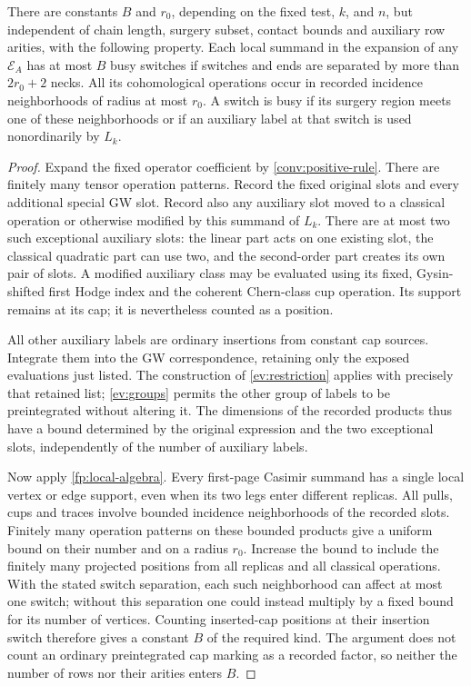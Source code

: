 \begin{lemma}\label{sew:busy-bound}
There are constants $B$ and $r_0$, depending on the fixed test, $k$,
and $n$, but independent of chain length, surgery subset, contact
bounds and auxiliary row arities, with the following property.
Each local summand in the expansion of any $\mathcal E_A$ has at most
$B$ busy switches if switches and ends are separated by more than
$2r_0+2$ necks.  All its cohomological operations occur in recorded
incidence neighborhoods of radius at most $r_0$.  A switch is busy if
its surgery region meets one of these neighborhoods or if an
auxiliary label at that switch is used nonordinarily by $L_k$.
\end{lemma}

\begin{proof}
Expand the fixed operator coefficient by \cref{conv:positive-rule}.
There are finitely many tensor operation patterns.  Record the fixed
original slots and every additional special GW slot.  Record also
any auxiliary slot moved to a classical operation or otherwise
modified by this summand of $L_k$.  There are at most two such
exceptional auxiliary slots: the linear part acts on one existing
slot, the classical quadratic part can use two, and the second-order
part creates its own pair of slots.  A modified auxiliary class may
be evaluated using its fixed, Gysin-shifted first Hodge index and the
coherent Chern-class cup operation.  Its support remains at its cap;
it is nevertheless counted as a position.

All other auxiliary labels are ordinary insertions from constant
cap sources.  Integrate them into the GW correspondence, retaining
only the exposed evaluations just listed.  The construction of
\cref{ev:restriction} applies with precisely that retained list;
\cref{ev:groups} permits the other group of labels to be preintegrated
without altering it.  The dimensions of the recorded products thus
have a bound determined by the original expression and the two
exceptional slots, independently of the number of auxiliary labels.

Now apply \cref{fp:local-algebra}.  Every first-page Casimir summand
has a single local vertex or edge support, even when its two legs
enter different replicas.  All pulls, cups and traces involve bounded
incidence neighborhoods of the recorded slots.  Finitely many
operation patterns on these bounded products give a uniform bound
on their number and on a radius $r_0$.  Increase the bound to include
the finitely many projected positions from all replicas and all
classical operations.  With the stated switch separation, each such
neighborhood can affect at most one switch; without this separation
one could instead multiply by a fixed bound for its number of
vertices.  Counting inserted-cap positions at their insertion switch
therefore gives a constant $B$ of the required kind.  The argument
does not count an ordinary preintegrated cap marking as a recorded
factor, so neither the number of rows nor their arities enters $B$.
\end{proof}

